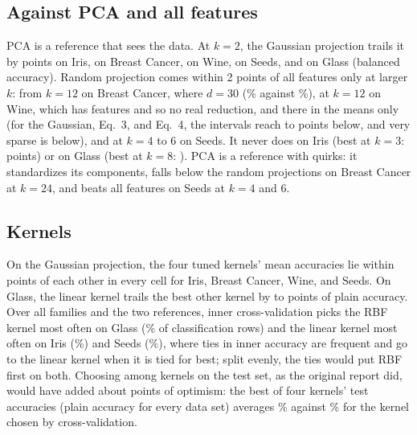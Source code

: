 \subsection{Against PCA and all features}

PCA is a reference that sees the data. At $k = 2$, the Gaussian projection trails it by  points on Iris,  on Breast Cancer,  on Wine,  on Seeds, and  on Glass (balanced accuracy). Random projection comes within 2 points of all features only at larger $k$: from $k = 12$ on Breast Cancer, where $d = 30$ (\% against \%), at $k = 12$ on Wine, which has  features and so no real reduction, and there in the means only (for the Gaussian, Eq.~3, and Eq.~4, the intervals reach  to  points below, and very sparse is  below), and at $k = 4$ to 6 on Seeds. It never does on Iris (best at $k = 3$:  points) or on Glass (best at $k = 8$: ). PCA is a reference with quirks: it standardizes its components, falls below the random projections on Breast Cancer at $k = 24$, and beats all features on Seeds at $k = 4$ and 6.

\subsection{Kernels}

On the Gaussian projection, the four tuned kernels' mean accuracies lie within  points of each other in every cell for Iris, Breast Cancer, Wine, and Seeds. On Glass, the linear kernel trails the best other kernel by  to  points of plain accuracy. Over all families and the two references, inner cross-validation picks the RBF kernel most often on Glass (\% of classification rows) and the linear kernel most often on Iris (\%) and Seeds (\%), where ties in inner accuracy are frequent and go to the linear kernel when it is tied for best; split evenly, the ties would put RBF first on both. Choosing among kernels on the test set, as the original report did, would have added about  points of optimism: the best of four kernels' test accuracies (plain accuracy for every data set) averages \% against \% for the kernel chosen by cross-validation.
